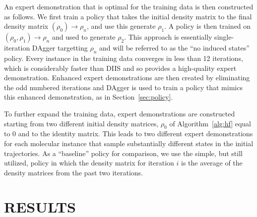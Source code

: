 \documentclass[twoside,11pt]{article}
\begin{document}
An expert demonstration that is optimal for the training data is then constructed as follows. We first train a policy that takes the initial density matrix to the final density matrix $(\rho_0) \rightarrow \rho_n$, and use this generate $\rho_1$. A policy is then trained on $(\rho_0, \rho_1) \rightarrow \rho_n$ and used to generate $\rho_2$. This approach is essentially single-iteration DAgger targetting $\rho_n$ and will be referred to as the ``no induced states'' policy. Every instance in the training data converges in less than 12 iterations, which is considerably faster than DIIS\cite{Pulay1980} and so provides a high-quality expert demonstration. Enhanced expert demonstrations are then created by eliminating the odd numbered iterations and DAgger is used to train a policy that mimics this enhanced demonstration, as in Section~\ref{sec:policy}. 

To further expand the training data, expert demonstrations are constructed starting from two different initial density matrices, $\rho_0$ of Algorithm~\ref{alg:hf} equal to 0 and to the identity matrix. This leads to two different expert demonstrations for each molecular instance that sample substantially different states in the initial trajectories. 
As a ``baseline'' policy for comparison, we use the simple, but still utilized, policy in which the density matrix for iteration $i$ is the average of the density matrices from the past two iterations.

\section{RESULTS}
\end{document}

